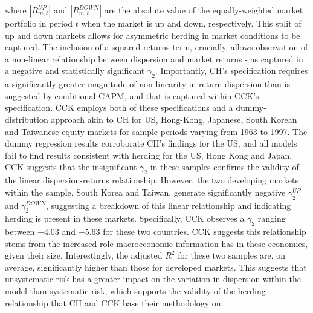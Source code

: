 \documentclass[12pt]{article}
\numberwithin{table}{section}   %
\begin{document}
where $|R_{m,t}^{UP}|$ and $|R_{m,t}^{DOWN}|$ are the absolute value of the equally-weighted market portfolio in period $t$ when the market is up and down, respectively. This split of up and down markets allows for asymmetric herding in market conditions to be captured. The inclusion of a squared returns term, crucially, allows observation of a non-linear relationship between dispersion and market returns - as captured in a negative and statistically significant $\gamma_2$. Importantly, CH’s specification requires a significantly greater magnitude of non-linearity in return dispersion than is suggested by conditional CAPM, and that is captured within CCK’s specification. CCK employs both of these specifications and a dummy-distribution approach akin to CH for US, Hong-Kong, Japanese, South Korean and Taiwanese equity markets for sample periods varying from 1963 to 1997. The dummy regression results corroborate CH’s findings for the US, and all models fail to find results consistent with herding for the US, Hong Kong and Japan. CCK suggests that the insignificant $\gamma_2$ in these samples confirms the validity of the linear dispersion-returns relationship. However, the two developing markets within the sample, South Korea and Taiwan, generate significantly negative $\gamma_2^{UP}$ and $\gamma_2^{DOWN}$, suggesting a breakdown of this linear relationship and indicating herding is present in these markets. Specifically, CCK observes a $\gamma_2$ ranging between $-4.03$ and $-5.63$ for these two countries. CCK suggests this relationship stems from the increased role macroeconomic information has in these economies, given their size. Interestingly, the adjusted $R^2$ for these two samples are, on average, significantly higher than those for developed markets. This suggests that unsystematic risk has a greater impact on the variation in dispersion within the model than systematic risk, which supports the validity of the herding relationship that CH and CCK base their methodology on.
\end{document}
